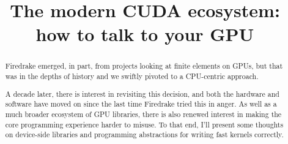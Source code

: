 \documentclass[presentation,aspectratio=43, 10pt]{beamer}
\title{The modern CUDA ecosystem: how to talk to your GPU}
\begin{document}
\begin{abstract}
  Firedrake emerged, in part, from projects looking at finite elements
  on GPUs, but that was in the depths of history and we swiftly
  pivoted to a CPU-centric approach.

  A decade later, there is interest in revisiting this decision, and
  both the hardware and software have moved on since the last time
  Firedrake tried this in anger. As well as a much broader ecosystem
  of GPU libraries, there is also renewed interest in making the core
  programming experience harder to misuse. To that end, I'll present
  some thoughts on device-side libraries and programming abstractions
  for writing fast kernels correctly.
\end{abstract}
\end{document}
